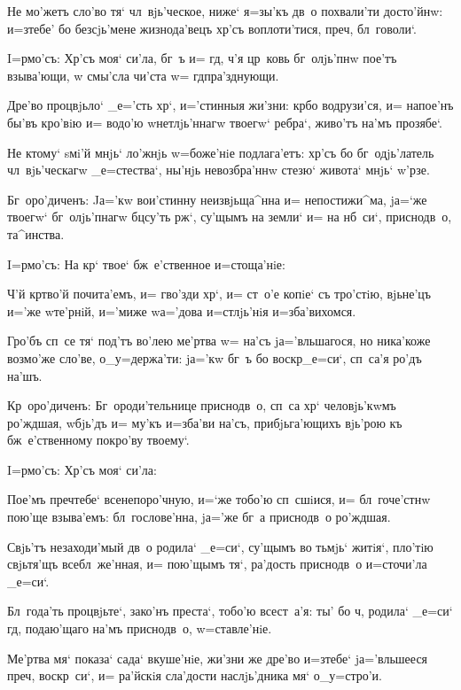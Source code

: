Не мо'жетъ сло'во тя` чл~вjь'ческое, ниже` я=зы'къ 
дв~о похвали'ти досто'йнw: и=з\ъ тебе' бо без\ъ сjь'мене 
жизнода'вецъ хр'съ воплоти'тися, преч, 
бл~говоли`.


I=рмо'съ: Хр'съ моя` си'ла, бг~ъ и= гд, 
ч'я цр~ковь бг~олjь'пнw пое'тъ взыва'ющи, w\т 
смы'сла чи'ста w= гд пра'зднующи.

Дре'во процвjьло` _е='сть хр`, и='стинныя жи'зни: 
кр бо водрузи'ся, и= напое'нъ бы'въ кро'вiю и= водо'ю 
w\т нетлjь'ннагw твоегw` ребра`, живо'тъ на'мъ прозябе`.

Не ктому` sмi'й мнjь` ло'жнjь w=боже'нiе подлага'етъ: 
хр'съ бо бг~одjь'латель чл~вjь'ческагw _е=стества`, 
ны'нjь невозбра'ннw стезю` живота` мнjь` w'рзе.

Бг~оро'диченъ: Jа='кw вои'стинну неизвjьща^нна и= 
непостижи^ма, jа=`же твоегw` бг~олjь'пнагw бц су'ть 
рж`, су'щымъ на земли` и= на нб~си`, приснодв~о, 
та^инства.

 I=рмо'съ: На кр` твое` бж~е'ственное 
и=стоща'нiе: 

Ч'й кр тво'й почита'емъ, и= гво'зди хр`, 
и= ст~о'е копiе` съ тро'стiю, вjьне'цъ и='же w\т те'рнiй, 
и='миже w\т а='дова и=стлjь'нiя и=зба'вихомся.

Гро'бъ сп~се тя` под'тъ во'лею ме'ртва w= на'съ 
jа='вльшагося, но ника'коже возмо'же сло'ве, 
о_у=держа'ти: jа='кw бг~ъ бо воскр _е=си`, сп~са'я 
ро'дъ на'шъ.

Кр~оро'диченъ: Бг~ороди'тельнице приснодв~о, 
сп~са хр` человjь'кwмъ ро'ждшая, w\т бjь'дъ и= му'къ 
и=зба'ви на'съ, прибjьга'ющихъ вjь'рою къ бж~е'ственному 
покро'ву твоему`. 

 I=рмо'съ: Хр'съ моя` си'ла: 

Пое'мъ преч тебе` всенепоро'чную, и=`же тобо'ю 
сп~сшiися, и= бл~гоче'стнw пою'ще взыва'емъ: 
бл~гослове'нна, jа='же бг~а приснодв~о ро'ждшая.

Свjь'тъ незаходи'мый дв~о родила` _е=си`, су'щымъ во 
тьмjь` житiя`, пло'тiю свjьтя'щъ всебл~же'нная, и= 
пою'щымъ тя`, ра'дость приснодв~о и=сточи'ла _е=си`.

Бл~года'ть процвjьте`, зако'нъ преста`, тобо'ю 
всест~а'я: ты' бо ч, родила` _е=си` гд, 
подаю'щаго на'мъ приснодв~о, w=ставле'нiе.

Ме'ртва мя` показа` сада` вкуше'нiе, жи'зни же дре'во 
и=з\ъ тебе` jа='вльшееся преч, воскр~си`, и= 
ра'йскiя сла'дости наслjь'дника мя` о_у=стро'и.

